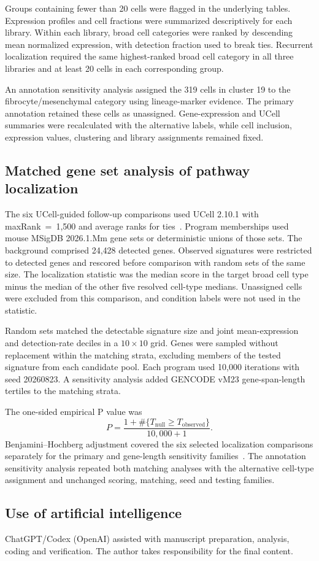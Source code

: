 Groups containing fewer than 20 cells were flagged in the underlying tables. Expression profiles and cell fractions were summarized descriptively for each library. Within each library, broad cell categories were ranked by descending mean normalized expression, with detection fraction used to break ties. Recurrent localization required the same highest-ranked broad cell category in all three libraries and at least 20 cells in each corresponding group.

An annotation sensitivity analysis assigned the 319 cells in cluster 19 to the fibrocyte/\allowbreak{}mesenchymal category using lineage-marker evidence. The primary annotation retained these cells as unassigned. Gene-expression and UCell summaries were recalculated with the alternative labels, while cell inclusion, expression values, clustering and library assignments remained fixed.

\subsection{Matched gene set analysis of pathway localization}

The six UCell-guided follow-up comparisons used UCell 2.10.1 with \mbox{maxRank = 1,500} and average ranks for ties~\citep{Andreatta2021}. Program memberships used mouse MSigDB 2026.1.Mm gene sets or deterministic unions of those sets. The background comprised 24,428 detected genes. Observed signatures were restricted to detected genes and rescored before comparison with random sets of the same size. The localization statistic was the median score in the target broad cell type minus the median of the other five resolved cell-type medians. Unassigned cells were excluded from this comparison, and condition labels were not used in the statistic.

Random sets matched the detectable signature size and joint mean-expression and detection-rate deciles in a \mbox{\(10\times10\)} grid. Genes were sampled without replacement within the matching strata, excluding members of the tested signature from each candidate pool. Each program used 10,000 iterations with seed 20260823. A sensitivity analysis added GENCODE vM23 gene-span-length tertiles to the matching strata.

The one-sided empirical P value was
\[
P = \frac{1 + \#\{T_{\mathrm{null}}\geq T_{\mathrm{observed}}\}}{10{,}000+1}.
\]
Benjamini--Hochberg adjustment covered the six selected localization comparisons separately for the primary and gene-length sensitivity families~\citep{Benjamini1995}. The annotation sensitivity analysis repeated both matching analyses with the alternative cell-type assignment and unchanged scoring, matching, seed and testing families.

\subsection{Use of artificial intelligence}

ChatGPT/\allowbreak{}Codex (OpenAI) assisted with manuscript preparation, analysis, coding and verification. The author takes responsibility for the final content.
